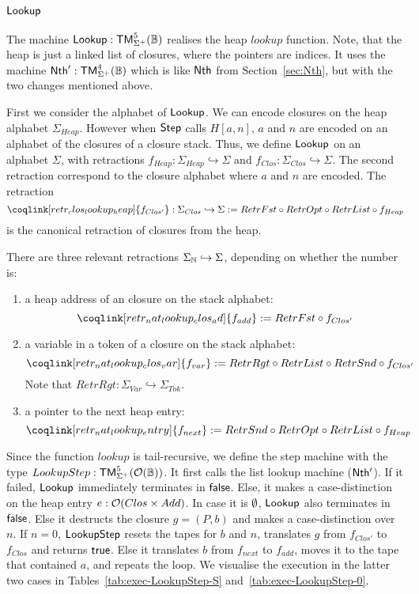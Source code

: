 \subsection{$\mathsf{Lookup}$}
\label{sec:Lookup}
%

The machine $\mathsf{Lookup} : \mathsf{TM}_{\Sigma^+}^5(\mathbb{B})$ realises the heap $lookup$ function.  Note, that the heap is just a linked list of closures, where
the pointers are indices.  It uses the machine $\mathsf{Nth}' : \mathsf{TM}_{\Sigma^+}^4(\mathbb{B})$ which is like $\mathsf{Nth}$ from Section~\ref{sec:Nth}, but with the
two changes mentioned above.

First we consider the alphabet of $\mathsf{Lookup}$.  We can encode closures on the heap alphabet $\Sigma_{Heap}$.  However when $\mathsf{Step}$ calls
$H[a,n]$, $a$ and $n$ are encoded on an alphabet of the closures of a closure stack.  Thus, we define $\mathsf{Lookup}$ on an alphabet $\Sigma$, with
retractions $f_{Heap} : \Sigma_{Heap} \hookrightarrow \Sigma$ and $f_{Clos} : \Sigma_{Clos} \hookrightarrow \Sigma$.  The second retraction correspond
to the closure alphabet where $a$ and $n$ are encoded.  The retraction
\[ \coqlink[retr_clos_lookup_heap]{f_{Clos'}} : \Sigma_{Clos} \hookrightarrow \Sigma := RetrFst \circ RetrOpt \circ RetrList \circ f_{Heap} \]%
is the canonical retraction of closures from the heap.

There are three relevant retractions $\Sigma_{\mathbb{N}} \hookrightarrow \Sigma$, depending on whether the number is:
\begin{enumerate}
\item a heap address of an closure on the stack alphabet:
  \[
    \coqlink[retr_nat_lookup_clos_ad]{f_{add}} := RetrFst \circ f_{Clos'}
  \]
\item a variable in a token of a closure on the stack alphabet:
  \[
    \coqlink[retr_nat_lookup_clos_var]{f_{var}} := RetrRgt \circ RetrList \circ RetrSnd \circ f_{Clos'}
  \]
  Note that $RetrRgt : \Sigma_{Var} \hookrightarrow \Sigma_{Tok}$.
\item a pointer to the next heap entry:
  \[
    \coqlink[retr_nat_lookup_entry]{f_{next}} := RetrSnd \circ RetrOpt \circ RetrList \circ f_{Heap}
  \]
\end{enumerate}

Since the function $lookup$ is tail-recursive, we define the step machine with the type $LookupStep : \mathsf{TM}_{\Sigma^+}^5(\mathcal{O}(\mathbb{B}))$.  It first
calls the list lookup machine ($\mathsf{Nth'}$).  If it failed, $\mathsf{Lookup}$ immediately terminates in $\mathsf{false}$.  Else, it makes a case-distinction on
the heap entry $e : \mathcal{O}(Clos \times Add)$.  In case it is $\emptyset$, $\mathsf{Lookup}$ also terminates in $\mathsf{false}$.  Else it destructs the closure
$g = (P,b)$ and makes a case-distinction over $n$.  If $n=0$, $\mathsf{LookupStep}$ resets the tapes for $b$ and $n$, translates $g$ from $f_{Clos'}$ to
$f_{Clos}$ and returns $\mathsf{true}$.  Else it translates $b$ from $f_{next}$ to $f_{add}$, moves it to the tape that contained $a$, and repeats the loop.
We visualise the execution in the latter two cases in Tables~\ref{tab:exec-LookupStep-S} and~\ref{tab:exec-LookupStep-0}.


